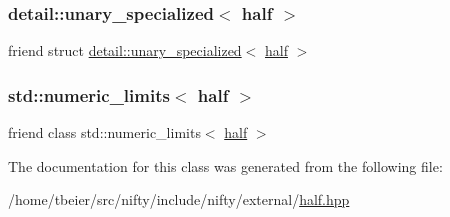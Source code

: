 \subsubsection{\texorpdfstring{detail\+::unary\+\_\+specialized$<$ half $>$}{detail::unary\_specialized< half >}}
{\footnotesize\ttfamily friend struct \hyperlink{structhalf__float_1_1detail_1_1unary__specialized}{detail\+::unary\+\_\+specialized}$<$ \hyperlink{classhalf__float_1_1half}{half} $>$\hspace{0.3cm}{\ttfamily [friend]}}

\mbox{\label{classhalf__float_1_1half_a30984629ce0edc2c2e5de40c72ab0292}} 
\subsubsection{\texorpdfstring{std\+::numeric\+\_\+limits$<$ half $>$}{std::numeric\_limits< half >}}
{\footnotesize\ttfamily friend class std\+::numeric\+\_\+limits$<$ \hyperlink{classhalf__float_1_1half}{half} $>$\hspace{0.3cm}{\ttfamily [friend]}}



The documentation for this class was generated from the following file\+:\begin{DoxyCompactItemize}
\item 
/home/tbeier/src/nifty/include/nifty/external/\hyperlink{half_8hpp}{half.\+hpp}\end{DoxyCompactItemize}

